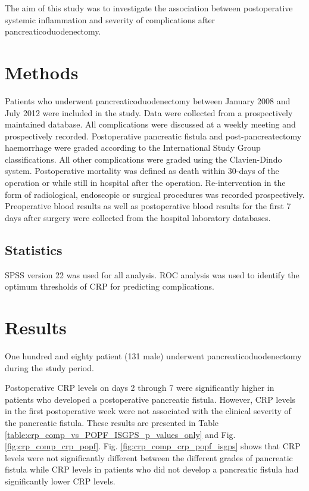 The aim of this study was to investigate the association between postoperative systemic inflammation and severity of complications after pancreaticoduodenectomy.
 
 
\clearpage
\section{Methods}
Patients who underwent pancreaticoduodenectomy between January 2008 and July 2012 were included in the study. Data were collected from a prospectively maintained database. All complications were discussed at a weekly meeting and prospectively recorded. Postoperative pancreatic fistula and post-pancreatectomy haemorrhage were graded according to the International Study Group classifications. All other complications were graded using the Clavien-Dindo system. Postoperative mortality was defined as death within 30-days of the operation or while still in hospital after the operation. Re-intervention in the form of radiological, endoscopic or surgical procedures was recorded prospectively. Preoperative blood results as well as postoperative blood results for the first 7 days after surgery were collected from the hospital laboratory databases. 

\subsection{Statistics}
SPSS version 22 was used for all analysis. ROC analysis was used to identify the optimum thresholds of CRP for predicting complications.



\clearpage
\section{Results}
One hundred and eighty patient (131 male) underwent pancreaticoduodenectomy during the study period. 

Postoperative CRP levels on days 2 through 7 were significantly higher in patients who developed a postoperative pancreatic fistula. However, CRP levels in the first postoperative week were not associated with the clinical severity of the pancreatic fistula. These results are presented in Table \ref{table:crp_comp_vs_POPF_ISGPS_p_values_only} and Fig. \ref{fig:crp_comp_crp_popf}. Fig. \ref{fig:crp_comp_crp_popf_isgps} shows that CRP levels were not significantly different between the different grades of pancreatic fistula while CRP levels in patients who did not develop a pancreatic fistula had significantly lower CRP levels.


